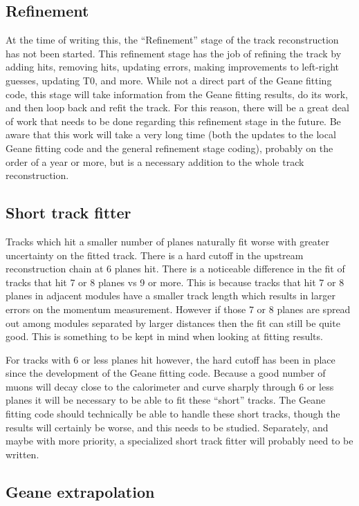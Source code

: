 	\subsection{Refinement}

		At the time of writing this, the ``Refinement'' stage of the track reconstruction has not been started. This refinement stage has the job of refining the track by adding hits, removing hits, updating errors, making improvements to left-right guesses, updating T0, and more. While not a direct part of the Geane fitting code, this stage will take information from the Geane fitting results, do its work, and then loop back and refit the track. For this reason, there will be a great deal of work that needs to be done regarding this refinement stage in the future. Be aware that this work will take a very long time (both the updates to the local Geane fitting code and the general refinement stage coding), probably on the order of a year or more, but is a necessary addition to the whole track reconstruction.

	\subsection{Short track fitter}

		Tracks which hit a smaller number of planes naturally fit worse with greater uncertainty on the fitted track. There is a hard cutoff in the upstream reconstruction chain at 6 planes hit. There is a noticeable difference in the fit of tracks that hit 7 or 8 planes vs 9 or more. This is because tracks that hit 7 or 8 planes in adjacent modules have a smaller track length which results in larger errors on the momentum measurement. However if those 7 or 8 planes are spread out among modules separated by larger distances then the fit can still be quite good. This is something to be kept in mind when looking at fitting results.

		For tracks with 6 or less planes hit however, the hard cutoff has been in place since the development of the Geane fitting code. Because a good number of muons will decay close to the calorimeter and curve sharply through 6 or less planes it will be necessary to be able to fit these ``short'' tracks. The Geane fitting code should technically be able to handle these short tracks, though the results will certainly be worse, and this needs to be studied. Separately, and maybe with more priority, a specialized short track fitter will probably need to be written.

	\subsection{Geane extrapolation}

